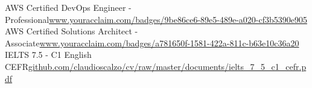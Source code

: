 



\begin{cvskills}
	\cvskill
{AWS Certified DevOps Engineer - Professional}{\href{https://www.youracclaim.com/badges/9be86ce6-89e5-489e-a020-cf3b5390e905}{www.youracclaim.com/badges/9be86ce6-89e5-489e-a020-cf3b5390e905}}
	\cvskill
{AWS Certified Solutions Architect - Associate}{\href{https://www.youracclaim.com/badges/a781650f-1581-422a-811c-b63e10c36a20}{www.youracclaim.com/badges/a781650f-1581-422a-811c-b63e10c36a20}}
	\cvskill
{IELTS 7.5 - C1 English CEFR}{\href{https://github.com/claudioscalzo/cv/raw/master/documents/ielts\_7\_5\_c1\_cefr.pdf}{github.com/claudioscalzo/cv/raw/master/documents/ielts\_7\_5\_c1\_cefr.pdf}}

\end{cvskills}
